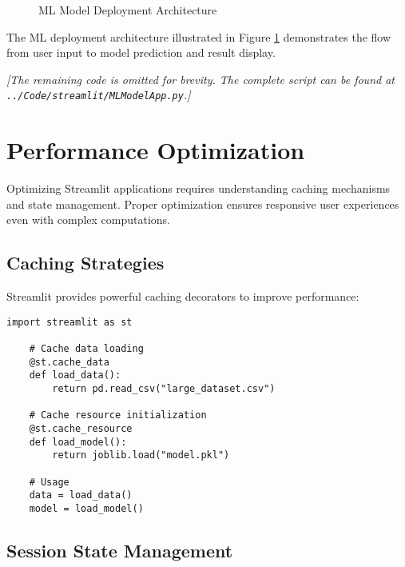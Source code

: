 \begin{figure}[htbp]
	\centering
    
	\caption{ML Model Deployment Architecture}
	\label{fig:ml_deployment}
\end{figure}

The ML deployment architecture illustrated in Figure \ref{fig:ml_deployment} demonstrates the flow from user input to model prediction and result display.



\noindent\textit{[The remaining code is omitted for brevity. The complete script can be found at \texttt{../Code/streamlit/MLModelApp.py}.]}

\section{Performance Optimization}
\label{sec:optimization}

Optimizing Streamlit applications requires understanding caching mechanisms and state management. Proper optimization ensures responsive user experiences even with complex computations.

\subsection{Caching Strategies}
\label{subsec:caching}

Streamlit provides powerful caching decorators to improve performance:

\begin{lstlisting}[language=MyPython, caption={Caching Configuration}, label={lst:caching}]
	import streamlit as st
	
	# Cache data loading
	@st.cache_data
	def load_data():
	    return pd.read_csv("large_dataset.csv")
	
	# Cache resource initialization
	@st.cache_resource
	def load_model():
	    return joblib.load("model.pkl")
	
	# Usage
	data = load_data()
	model = load_model()
\end{lstlisting}

\subsection{Session State Management}
\label{subsec:session_state}

